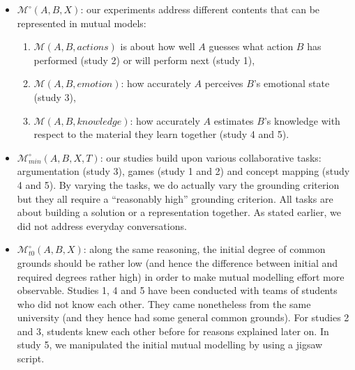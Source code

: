 \documentclass[natbib]{svjour3}
\newcommand{\model}[3]{{$\mathcal{M}(#1, #2, #3)$}}
\newcommand{\Model}[3]{{$\mathcal{M}^{\circ}(#1, #2, #3)$}}
\begin{document}
\begin{itemize}
    \item \Model{A}{B}{X}: our experiments address different contents that can be
        represented in mutual models:

    \begin{enumerate}

        \item \model{A}{B}{actions} is about how well $A$ guesses what action $B$ has
            performed (study 2) or will perform next (study 1),

        \item \model{A}{B}{emotion}: how accurately $A$ perceives $B$'s emotional state
            (study 3),

        \item \model{A}{B}{knowledge}: how accurately $A$ estimates $B$'s knowledge
            with respect to the material they learn together (study 4 and 5).

    \end{enumerate}



    \item $\mathcal{M}^{\circ}_{min}(A,B,X,T)$: our studies build upon various
        collaborative tasks: argumentation (study 3), games (study 1 and 2) and
        concept mapping (study 4 and 5). By varying the tasks, we do actually
        vary the grounding criterion but they all require a ``reasonably high''
        grounding criterion.  All tasks are about building a solution or a
        representation together. As stated earlier, we did not address everyday conversations. 

    \item $\mathcal{M}^{\circ}_{t0}(A,B,X)$: along the same reasoning, the initial degree
        of common grounds should be rather low (and hence the difference between
        initial and required degrees rather high) in order to make mutual
        modelling effort more observable. Studies 1, 4 and 5 have been conducted
        with teams of students who did not know each other. They came
        nonetheless from the same university (and they hence had some general common
        grounds).  For studies 2 and 3, students knew each other before for
        reasons explained later on. In study 5, we manipulated the initial mutual modelling by
        using a {\sc jigsaw} script.


\end{itemize}
\end{document}
